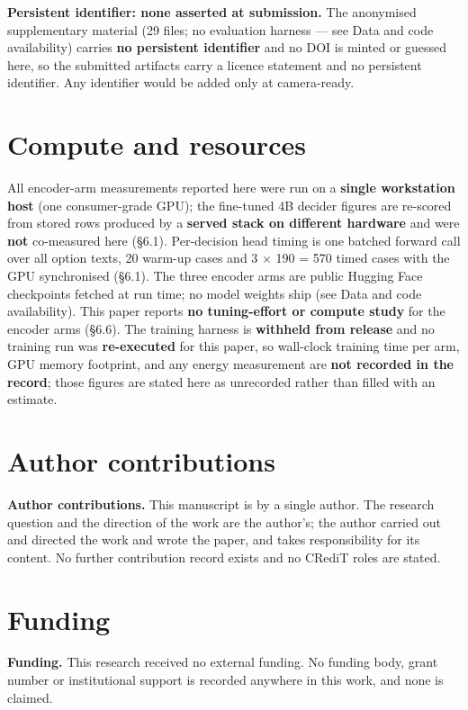 \documentclass[10pt]{article}
\begin{document}
\textbf{Persistent identifier: none asserted at submission.} The anonymised supplementary material (29 files; no evaluation harness --- see Data and code availability) carries \textbf{no persistent identifier} and no DOI is minted or guessed here, so the submitted artifacts carry a licence statement and no persistent identifier. Any identifier would be added only at camera-ready.

\section*{Compute and resources}

All encoder-arm measurements reported here were run on a \textbf{single workstation host} (one consumer-grade GPU); the fine-tuned 4B decider figures are re-scored from stored rows produced by a \textbf{served stack on different hardware} and were \textbf{not} co-measured here (\S6.1). Per-decision head timing is one batched forward call over all option texts, 20 warm-up cases and 3 $\times$ 190 = 570 timed cases with the GPU synchronised (\S6.1). The three encoder arms are public Hugging Face checkpoints fetched at run time; no model weights ship (see Data and code availability). This paper reports \textbf{no tuning-effort or compute study} for the encoder arms (\S6.6). The training harness is \textbf{withheld from release} and no training run was \textbf{re-executed} for this paper, so wall-clock training time per arm, GPU memory footprint, and any energy measurement are \textbf{not recorded in the record}; those figures are stated here as unrecorded rather than filled with an estimate.

\section*{Author contributions}

\textbf{Author contributions.} This manuscript is by a single author. The research question and the direction of the work are the author's; the author carried out and directed the work and wrote the paper, and takes responsibility for its content. No further contribution record exists and no CRediT roles are stated.

\section*{Funding}

\textbf{Funding.} This research received no external funding. No funding body, grant number or institutional support is recorded anywhere in this work, and none is claimed.
\end{document}
